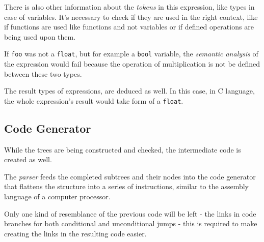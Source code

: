             There is also other information about the \emph{tokens} in this expression, like types in case of variables. It's necessary to check if they are used in the right context, like if functions are used like functions and not variables or if defined operations are being used upon them.

            \begin{center}\end{center}

            If \texttt{foo} was not a \texttt{float}, but for example a \texttt{bool} variable, the \emph{semantic analysis} of the expression would fail because the operation of multiplication is not be defined between these two types.

            The result types of expressions, are deduced as well. In this case, in C language, the whole expression's result would take form of a \texttt{float}.

        \subsection{Code Generator}

            While the trees are being constructed and checked, the intermediate code is created as well.

            The \emph{parser} feeds the completed subtrees and their nodes into the code generator that flattens the structure into a series of instructions, similar to the assembly language of a computer processor.

            Only one kind of resemblance of the previous code will be left - the links in code branches for both conditional and unconditional jumps - this is required to make creating the links in the resulting code easier.

